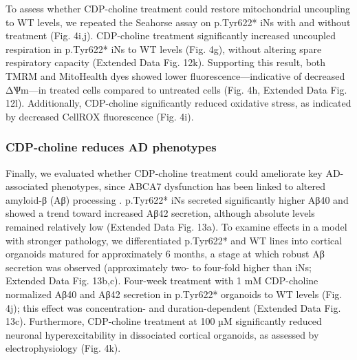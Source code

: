 To assess whether CDP-choline treatment could restore mitochondrial uncoupling to WT levels, we repeated the Seahorse assay on p.Tyr622* iNs with and without treatment (Fig. 4i,j). CDP-choline treatment significantly increased uncoupled respiration in p.Tyr622* iNs to WT levels (Fig. 4g), without altering spare respiratory capacity (Extended Data Fig. 12k). Supporting this result, both TMRM and MitoHealth dyes showed lower fluorescence—indicative of decreased ΔѰm—in treated cells compared to untreated cells (Fig. 4h, Extended Data Fig. 12l). Additionally, CDP-choline significantly reduced oxidative stress, as indicated by decreased CellROX fluorescence (Fig. 4i).

\subsubsection{ CDP-choline reduces AD phenotypes}
Finally, we evaluated whether CDP-choline treatment could ameliorate key AD-associated phenotypes, since ABCA7 dysfunction has been linked to altered amyloid-β (Aβ) processing \supercite{Duchateau2024-rf}. p.Tyr622* iNs secreted significantly higher Aβ40 and showed a trend toward increased Aβ42 secretion, although absolute levels remained relatively low (Extended Data Fig. 13a). To examine effects in a model with stronger pathology, we differentiated p.Tyr622* and WT lines into cortical organoids matured for approximately 6 months, a stage at which robust Aβ secretion was observed (approximately two- to four-fold higher than iNs; Extended Data Fig. 13b,c). Four-week treatment with 1 mM CDP-choline normalized Aβ40 and Aβ42 secretion in p.Tyr622* organoids to WT levels (Fig. 4j); this effect was concentration- and duration-dependent (Extended Data Fig. 13c). Furthermore, CDP-choline treatment at 100 µM significantly reduced neuronal hyperexcitability in dissociated cortical organoids, as assessed by electrophysiology (Fig. 4k).
